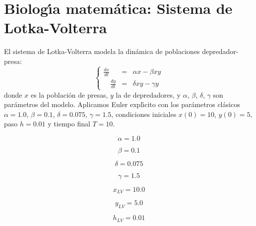\documentclass{article}
\begin{document}

\section{Biolog\'{\i}a matem\'atica: Sistema de Lotka-Volterra}

El sistema de Lotka-Volterra modela la din\'amica de poblaciones depredador-presa:
\[
\left \{
\begin{array}{rrrr}
    \frac{dx}{dt} & = &\alpha x - \beta x y \\
    \quad \frac{dy}{dt} & = &\delta x y - \gamma y
\end{array}
\right .
\]
donde $x$ es la poblaci\'on de presas, $y$ la de depredadores, y $\alpha$, $\beta$,
$\delta$, $\gamma$ son par\'ametros del modelo. Aplicamos Euler expl\'{\i}cito con los
par\'ametros cl\'asicos $\alpha = 1.0$, $\beta = 0.1$, $\delta = 0.075$, $\gamma = 1.5$,
condiciones iniciales $x(0) = 10$, $y(0) = 5$, paso $h = 0.01$ y tiempo final $T = 10$.

\begin{equation}
    \alpha = 1.0
    \label{eq:calc:alpha}
\end{equation}

\begin{equation}
    \beta = 0.1
    \label{eq:calc:beta}
\end{equation}

\begin{equation}
    \delta = 0.075
    \label{eq:calc:delta}
\end{equation}

\begin{equation}
    \gamma = 1.5
    \label{eq:calc:gamma}
\end{equation}

\begin{equation}
    x_{LV} = 10.0
    \label{eq:calc:xlv}
\end{equation}

\begin{equation}
    y_{LV} = 5.0
    \label{eq:calc:ylv}
\end{equation}

\begin{equation}
    h_{LV} = 0.01
    \label{eq:calc:hlv}
\end{equation}
\end{document}
